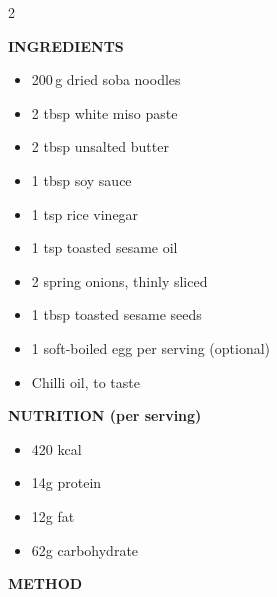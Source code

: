 \documentclass[a4paper,10pt]{article}
\begin{document}
\begin{multicols}{2}

{\color{tagline}\bfseries\small INGREDIENTS}
\vspace{0.3em}

\begin{itemize}[leftmargin=1em, itemsep=2pt, label={\color{tagline}\tiny\textbullet}]
  \item 200\,g dried soba noodles
  \item 2 tbsp white miso paste
  \item 2 tbsp unsalted butter
  \item 1 tbsp soy sauce
  \item 1 tsp rice vinegar
  \item 1 tsp toasted sesame oil
  \item 2 spring onions, thinly sliced
  \item 1 tbsp toasted sesame seeds
  \item 1 soft-boiled egg per serving (optional)
  \item Chilli oil, to taste
\end{itemize}

\vspace{0.6em}
{\color{tagline}\bfseries\small NUTRITION (per serving)}
\vspace{0.3em}

\begin{itemize}[leftmargin=1em, itemsep=1pt, label={\color{tagline}\tiny\textbullet}]
  \item 420 kcal
  \item 14g protein
  \item 12g fat
  \item 62g carbohydrate
\end{itemize}

\columnbreak

{\color{tagline}\bfseries\small METHOD}
\vspace{0.3em}


\end{multicols}
\end{document}
